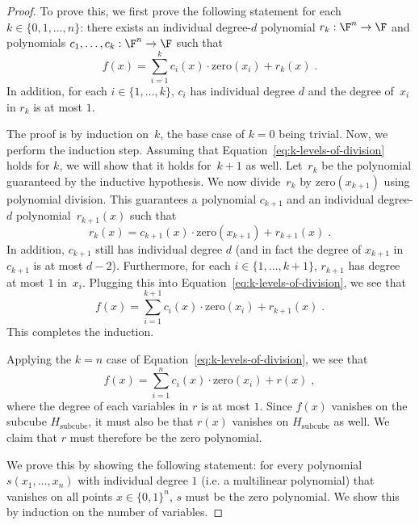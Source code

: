  \begin{proof}
    To prove this, we first prove the following statement for each $k \in \{0,
    1, \ldots, n\}$: there exists an individual degree-$d$ polynomial $r_k:\F^{n}
    \rightarrow \F$ and polynomials $c_1, \ldots, c_k:\F^n \rightarrow \F$ such
    that
  \begin{equation}\label{eq:k-levels-of-division}
  f(x) = \sum_{i=1}^k c_i(x) \cdot \mathrm{zero}(x_i) + r_k(x)\;.
  \end{equation}
  In addition, for each $i \in \{1, \ldots, k\}$, $c_i$ has individual degree
  $d$ and the degree of~$x_i$ in $r_k$ is at most $1$.
  
  The proof is by induction on~$k$, the base case of $k = 0$ being trivial.
  Now, we perform the induction step.
  Assuming that Equation~\eqref{eq:k-levels-of-division} holds for $k$, we will
  show that it holds for~$k+1$ as well.
  Let~$r_k$ be the polynomial guaranteed by the inductive hypothesis.
  We now divide~$r_k$ by $\mathrm{zero}(x_{k+1})$ using polynomial
  division.
  This guarantees a polynomial $c_{k+1}$ and an individual degree-$d$
  polynomial~$r_{k+1}(x)$ such that
  \begin{equation*}
  r_k(x) = c_{k+1}(x) \cdot \mathrm{zero}(x_{k+1}) + r_{k+1}(x)\;.
  \end{equation*}
  In addition, $c_{k+1}$ still has individual degree $d$ (and in fact the degree
  of $x_{k+1}$ in $c_{k+1}$ is at most $d - 2$).
  Furthermore, for each $i \in \{1, \ldots, k+1\}$, $r_{k+1}$ has degree at most
  $1$ in~$x_i$.
  Plugging this into Equation~\eqref{eq:k-levels-of-division}, we see that
  \begin{equation}\label{eq:almost-there}
  f(x) = \sum_{i=1}^{k+1} c_i(x) \cdot \mathrm{zero}(x_i) + r_{k+1}(x)\;.  
  \end{equation}
  This completes the induction.
  
  Applying the $k = n$ case of Equation~\eqref{eq:k-levels-of-division}, we see
  that
  \begin{equation}\label{eq:case-n-of-induction}
  f(x) = \sum_{i=1}^n c_i(x) \cdot \mathrm{zero}(x_i) + r(x)\;,
  \end{equation}
  where the degree of each variables in $r$ is at most $1$.
  Since $f(x)$ vanishes on the subcube $H_{\mathrm{subcube}}$, it must also be
  that $r(x)$ vanishes on $H_{\mathrm{subcube}}$ as well.
  We claim that $r$ must therefore be the zero polynomial.
  
  We prove this by showing the following statement: for every polynomial
  $s(x_1,\ldots,x_n)$ with individual degree $1$ (i.e.
  a multilinear polynomial) that vanishes on all points $x \in \{0,1\}^n$, $s$
  must be the zero polynomial.
  We show this by induction on the number of variables.
  

\end{proof}
